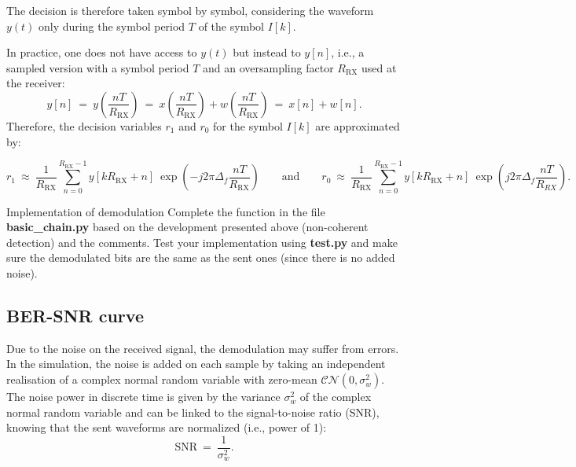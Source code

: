 The decision is therefore taken symbol by symbol, considering the waveform $y(t)$ only during the symbol period $T$ of the symbol $I[k]$.

In practice, one does not have access to $y(t)$ but instead to $y[n]$, i.e., a sampled version with a symbol period $T$ and an oversampling factor $R_{\text{RX}}$ used at the receiver:
\begin{equation*}
    y[n]\:=\:y\left(\frac{nT}{R_{\text{RX}}}\right)\:=\:x\left(\frac{nT}{R_{\text{RX}}}\right)+w\left(\frac{nT}{R_{\text{RX}}}\right)\:=\: x[n] + w[n].
\end{equation*}
Therefore, the decision variables $r_1$ and $r_0$ for the symbol $I[k]$ are approximated by:
\begin{small}
\begin{equation*}
    r_1\:\approx\:\frac{1}{R_{\text{RX}}}\sum_{n=0}^{R_{\text{RX}}-1} y[kR_{\text{RX}}+n] \:\exp \left(-j2\pi \Delta_f \frac{nT}{R_{\text{RX}}}\right)\qquad \text{and} \qquad r_0\:\approx\:\frac{1}{R_{\text{RX}}}\sum_{n=0}^{R_{\text{RX}}-1} y[kR_{\text{RX}}+n] \:\exp \left(j2\pi \Delta_f \frac{nT}{R_{RX}}\right).
\end{equation*}
\end{small}

\begin{bclogo}[couleur = gray!20, arrondi = 0.2, logo=\bccrayon]{Implementation of demodulation}
Complete the  function in the file \textbf{basic\_chain.py} based on the development presented above (non-coherent detection) and the comments. Test your implementation using \textbf{test.py} and make sure the demodulated bits are the same as the sent ones (since there is no added noise).
\end{bclogo}

\subsection{BER-SNR curve}
Due to the noise on the received signal, the demodulation may suffer from errors. In the simulation, the noise is added on each sample by taking an independent realisation of a complex normal random variable with zero-mean $\mathcal{CN}(0,\sigma_w^2)$. The noise power in discrete time is given by the variance $\sigma_w^2$ of the complex normal random variable and can be linked to the signal-to-noise ratio (SNR), knowing that the sent waveforms are normalized (i.e., power of 1):
\begin{equation*}
    \text{SNR}\:=\:\frac{1}{\sigma_w^2}.
\end{equation*}

